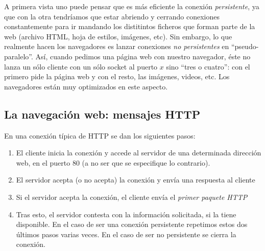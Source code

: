 \documentclass[10pt,a4paper,spanish]{report}
\begin{document}
A primera vista uno puede pensar que es más eficiente la conexión \textit{\textcolor{tema2}{persistente}}, ya que con la otra tendríamos que estar abriendo y cerrando conexiones constantemente para ir mandando los distitintos ficheros que forman parte de la web (archivo HTML, hoja de estilos, imágenes, etc). Sin embargo, lo que realmente hacen los navegadores es lanzar conexiones \textit{\textcolor{tema2}{no persistentes}} en ``pseudo-paralelo''. Así, cuando pedimos una página web con nuestro navegador, éste no lanza un sólo cliente con un sólo socket al puerto $x$ sino ``tres o cuatro'': con el primero pide la página web y con el resto, las imágenes, videos, etc. Los navegadores están muy optimizados en este aspecto.

\subsection{\textcolor{tema2}La navegación web: mensajes HTTP}
En una conexión típica de HTTP se dan los siguientes pasos:
\begin{enumerate}[1.]
  \item El cliente inicia la conexión y accede al servidor de una determinada dirección web, en el puerto 80 (a no ser que se especifique lo contrario).
  \item El servidor acepta (o no acepta) la conexión y envía una respuesta al cliente
  \item Si el servidor acepta la conexión, el cliente envía el \textit{\textcolor{tema2}{primer paquete HTTP}}
  \item Tras esto, el servidor contesta con la información solicitada, si la tiene disponible. En el caso de ser una conexión persistente repetimos estos dos últimos pasos varias veces. En el caso de ser no persistente se cierra la conexión.
\end{enumerate}
\end{document}
